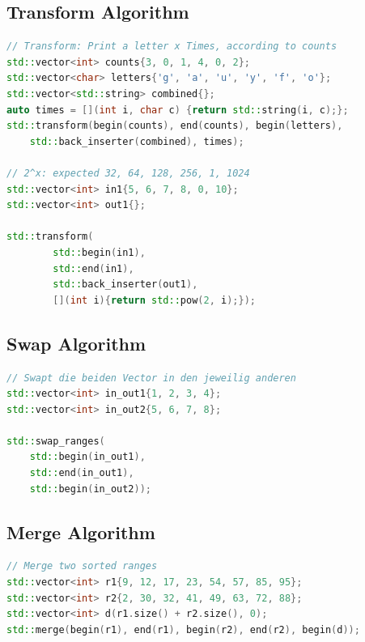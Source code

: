 \subsection{Transform Algorithm}
\begin{lstlisting}[language=C++, caption=Transform Algorithm]
// Transform: Print a letter x Times, according to counts
std::vector<int> counts{3, 0, 1, 4, 0, 2};
std::vector<char> letters{'g', 'a', 'u', 'y', 'f', 'o'};
std::vector<std::string> combined{};
auto times = [](int i, char c) {return std::string(i, c);};
std::transform(begin(counts), end(counts), begin(letters), 
	std::back_inserter(combined), times);

// 2^x: expected 32, 64, 128, 256, 1, 1024
std::vector<int> in1{5, 6, 7, 8, 0, 10};
std::vector<int> out1{};

std::transform(
		std::begin(in1),
		std::end(in1),
		std::back_inserter(out1),
		[](int i){return std::pow(2, i);});
\end{lstlisting}

\newpage
\subsection{Swap Algorithm}
\begin{lstlisting}[language=C++, caption=Transform Algorithm]
// Swapt die beiden Vector in den jeweilig anderen
std::vector<int> in_out1{1, 2, 3, 4};
std::vector<int> in_out2{5, 6, 7, 8};

std::swap_ranges(
	std::begin(in_out1),
	std::end(in_out1),
	std::begin(in_out2));
\end{lstlisting}

\subsection{Merge Algorithm}
\begin{lstlisting}[language=C++, caption=Merge Algorithm]
// Merge two sorted ranges
std::vector<int> r1{9, 12, 17, 23, 54, 57, 85, 95};
std::vector<int> r2{2, 30, 32, 41, 49, 63, 72, 88};
std::vector<int> d(r1.size() + r2.size(), 0);
std::merge(begin(r1), end(r1), begin(r2), end(r2), begin(d));
\end{lstlisting}

